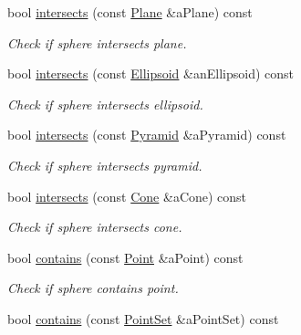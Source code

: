 \begin{DoxyCompactItemize}
bool \hyperlink{classlibrary_1_1math_1_1geom_1_1d3_1_1objects_1_1_sphere_aa0893ce62c0798552353338aad0b8da4}{intersects} (const \hyperlink{classlibrary_1_1math_1_1geom_1_1d3_1_1objects_1_1_plane}{Plane} \&a\+Plane) const
\begin{DoxyCompactList}\small\item\em Check if sphere intersects plane. \end{DoxyCompactList}\item 
bool \hyperlink{classlibrary_1_1math_1_1geom_1_1d3_1_1objects_1_1_sphere_ad278cbe34b3fde84126202d772f9df27}{intersects} (const \hyperlink{classlibrary_1_1math_1_1geom_1_1d3_1_1objects_1_1_ellipsoid}{Ellipsoid} \&an\+Ellipsoid) const
\begin{DoxyCompactList}\small\item\em Check if sphere intersects ellipsoid. \end{DoxyCompactList}\item 
bool \hyperlink{classlibrary_1_1math_1_1geom_1_1d3_1_1objects_1_1_sphere_a698e81554ca85819741fdfdcd123e8a1}{intersects} (const \hyperlink{classlibrary_1_1math_1_1geom_1_1d3_1_1objects_1_1_pyramid}{Pyramid} \&a\+Pyramid) const
\begin{DoxyCompactList}\small\item\em Check if sphere intersects pyramid. \end{DoxyCompactList}\item 
bool \hyperlink{classlibrary_1_1math_1_1geom_1_1d3_1_1objects_1_1_sphere_a64889a39d7df049b119bda0eb922f949}{intersects} (const \hyperlink{classlibrary_1_1math_1_1geom_1_1d3_1_1objects_1_1_cone}{Cone} \&a\+Cone) const
\begin{DoxyCompactList}\small\item\em Check if sphere intersects cone. \end{DoxyCompactList}\item 
bool \hyperlink{classlibrary_1_1math_1_1geom_1_1d3_1_1objects_1_1_sphere_a2780e2754d206379fbe2cdc06b799a2e}{contains} (const \hyperlink{classlibrary_1_1math_1_1geom_1_1d3_1_1objects_1_1_point}{Point} \&a\+Point) const
\begin{DoxyCompactList}\small\item\em Check if sphere contains point. \end{DoxyCompactList}\item 
bool \hyperlink{classlibrary_1_1math_1_1geom_1_1d3_1_1objects_1_1_sphere_a75120c9d3ff75cd389ae9ccb98a4218b}{contains} (const \hyperlink{classlibrary_1_1math_1_1geom_1_1d3_1_1objects_1_1_point_set}{Point\+Set} \&a\+Point\+Set) const

\end{DoxyCompactItemize}
